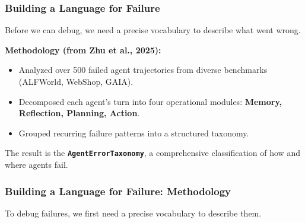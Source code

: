 \documentclass[10pt]{beamer}
\begin{document}
\begin{frame}
  \frametitle{Building a Language for Failure}
  Before we can debug, we need a precise vocabulary to describe what went wrong.
  
  \textbf{Methodology (from Zhu et al., 2025):}
  \begin{itemize}
      \item Analyzed over 500 failed agent trajectories from diverse benchmarks (ALFWorld, WebShop, GAIA).
      \item Decomposed each agent's turn into four operational modules: \textbf{Memory, Reflection, Planning, Action}.
      \item Grouped recurring failure patterns into a structured taxonomy.
  \end{itemize}
  
  \vfill
  
  The result is the \textbf{\texttt{AgentErrorTaxonomy}}, a comprehensive classification of how and where agents fail.
\end{frame}


\begin{frame}
  \frametitle{Building a Language for Failure: Methodology}
  To debug failures, we first need a precise vocabulary to describe them.
  
  \begin{center}
  \end{center}
\end{frame}
\end{document}
